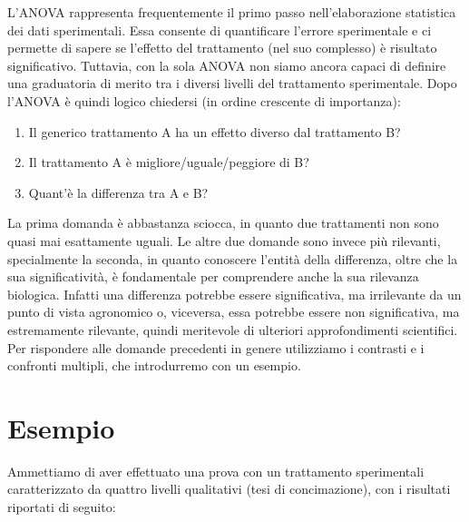 \documentclass[a4paper,12pt,oneside]{book}
\providecommand{\tightlist}{%
  \setlength{\itemsep}{0pt}\setlength{\parskip}{0pt}}
\theoremstyle{definition}
\theoremstyle{definition}
\theoremstyle{definition}
\theoremstyle{remark}
\begin{document}
L'ANOVA rappresenta frequentemente il primo passo nell'elaborazione
statistica dei dati sperimentali. Essa consente di quantificare l'errore
sperimentale e ci permette di sapere se l'effetto del trattamento (nel
suo complesso) è risultato significativo. Tuttavia, con la sola ANOVA
non siamo ancora capaci di definire una graduatoria di merito tra i
diversi livelli del trattamento sperimentale. Dopo l'ANOVA è quindi
logico chiedersi (in ordine crescente di importanza):

\begin{enumerate}
\def\labelenumi{\arabic{enumi}.}
\tightlist
\item
  Il generico trattamento A ha un effetto diverso dal trattamento B?
\item
  Il trattamento A è migliore/uguale/peggiore di B?
\item
  Quant'è la differenza tra A e B?
\end{enumerate}

La prima domanda è abbastanza sciocca, in quanto due trattamenti non
sono quasi mai esattamente uguali. Le altre due domande sono invece più
rilevanti, specialmente la seconda, in quanto conoscere l'entità della
differenza, oltre che la sua significatività, è fondamentale per
comprendere anche la sua rilevanza biologica. Infatti una differenza
potrebbe essere significativa, ma irrilevante da un punto di vista
agronomico o, viceversa, essa potrebbe essere non significativa, ma
estremamente rilevante, quindi meritevole di ulteriori approfondimenti
scientifici. Per rispondere alle domande precedenti in genere
utilizziamo i contrasti e i confronti multipli, che introdurremo con un
esempio.

\section{Esempio}\label{esempio}

Ammettiamo di aver effettuato una prova con un trattamento sperimentali
caratterizzato da quattro livelli qualitativi (tesi di concimazione),
con i risultati riportati di seguito:
\end{document}
